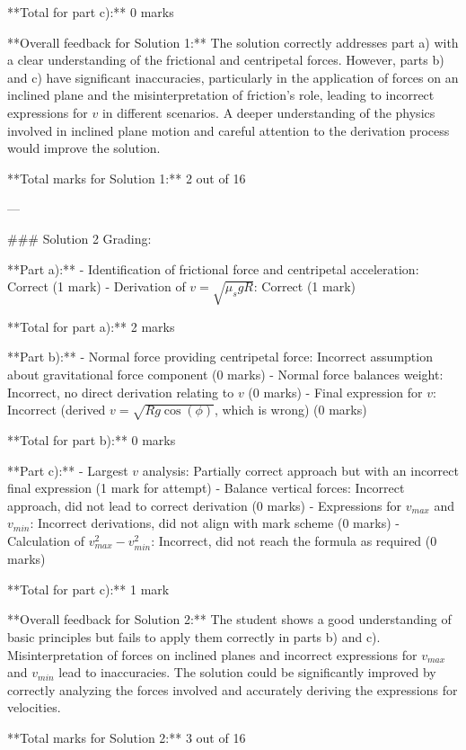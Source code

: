 \documentclass[a4paper,11pt]{article}
\begin{document}
**Total for part c):** 0 marks

**Overall feedback for Solution 1:** The solution correctly addresses part a) with a clear understanding of the frictional and centripetal forces. However, parts b) and c) have significant inaccuracies, particularly in the application of forces on an inclined plane and the misinterpretation of friction's role, leading to incorrect expressions for \(v\) in different scenarios. A deeper understanding of the physics involved in inclined plane motion and careful attention to the derivation process would improve the solution.

**Total marks for Solution 1:** 2 out of 16

---

### Solution 2 Grading:

**Part a):**
- Identification of frictional force and centripetal acceleration: Correct (1 mark)
- Derivation of \(v = \sqrt{\mu_s g R}\): Correct (1 mark)
  
**Total for part a):** 2 marks

**Part b):**
- Normal force providing centripetal force: Incorrect assumption about gravitational force component (0 marks)
- Normal force balances weight: Incorrect, no direct derivation relating to \(v\) (0 marks)
- Final expression for \(v\): Incorrect (derived \(v = \sqrt{Rg\cos(\phi)}\), which is wrong) (0 marks)
  
**Total for part b):** 0 marks

**Part c):**
- Largest \(v\) analysis: Partially correct approach but with an incorrect final expression (1 mark for attempt)
- Balance vertical forces: Incorrect approach, did not lead to correct derivation (0 marks)
- Expressions for \(v_{max}\) and \(v_{min}\): Incorrect derivations, did not align with mark scheme (0 marks)
- Calculation of \(v_{max}^2 - v_{min}^2\): Incorrect, did not reach the formula as required (0 marks)
  
**Total for part c):** 1 mark

**Overall feedback for Solution 2:** The student shows a good understanding of basic principles but fails to apply them correctly in parts b) and c). Misinterpretation of forces on inclined planes and incorrect expressions for \(v_{max}\) and \(v_{min}\) lead to inaccuracies. The solution could be significantly improved by correctly analyzing the forces involved and accurately deriving the expressions for velocities.

**Total marks for Solution 2:** 3 out of 16
\end{document}
